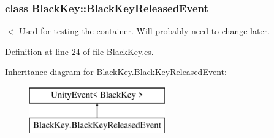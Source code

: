 \subsubsection{class Black\+Key\+:\+:Black\+Key\+Released\+Event}
$<$ Used for testing the container. Will probably need to change later. 

Definition at line 24 of file Black\+Key.\+cs.

Inheritance diagram for Black\+Key.\+Black\+Key\+Released\+Event\+:\begin{figure}[H]
\begin{center}
\leavevmode
\includegraphics[height=2.000000cm]{group___black_key_event_types}
\end{center}
\end{figure}
